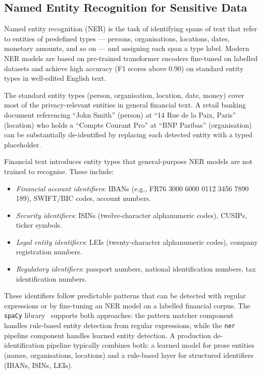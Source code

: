 \subsection{Named Entity Recognition for Sensitive Data}
\label{sec:ch15-ner}

Named entity recognition (NER) is the task of identifying spans of text that refer to entities of predefined types — persons, organisations, locations, dates, monetary amounts, and so on — and assigning each span a type label. Modern NER models are based on pre-trained transformer encoders fine-tuned on labelled datasets and achieve high accuracy (F1 scores above 0.90) on standard entity types in well-edited English text.

The standard entity types (person, organisation, location, date, money) cover most of the privacy-relevant entities in general financial text. A retail banking document referencing ``John Smith'' (person) at ``14 Rue de la Paix, Paris'' (location) who holds a ``Compte Courant Pro'' at ``BNP Paribas'' (organisation) can be substantially de-identified by replacing each detected entity with a typed placeholder.

Financial text introduces entity types that general-purpose NER models are not trained to recognise. These include:
\begin{itemize}
  \item \emph{Financial account identifiers}: IBANs (e.g., FR76 3000 6000 0112 3456 7890 189), SWIFT/BIC codes, account numbers.
  \item \emph{Security identifiers}: ISINs (twelve-character alphanumeric codes), CUSIPs, ticker symbols.
  \item \emph{Legal entity identifiers}: LEIs (twenty-character alphanumeric codes), company registration numbers.
  \item \emph{Regulatory identifiers}: passport numbers, national identification numbers, tax identification numbers.
\end{itemize}

These identifiers follow predictable patterns that can be detected with regular expressions or by fine-tuning an NER model on a labelled financial corpus. The \texttt{spaCy} library~\citep{honnibal2017spacy} supports both approaches: the pattern matcher component handles rule-based entity detection from regular expressions, while the \texttt{ner} pipeline component handles learned entity detection. A production de-identification pipeline typically combines both: a learned model for prose entities (names, organisations, locations) and a rule-based layer for structured identifiers (IBANs, ISINs, LEIs).

